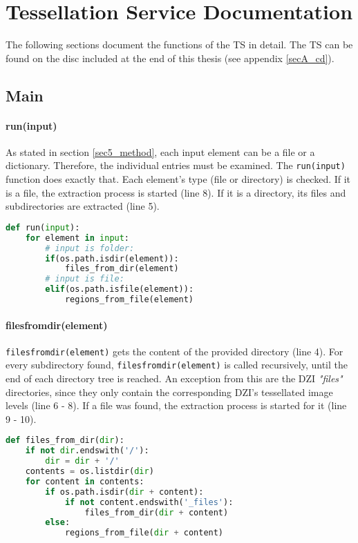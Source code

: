 \chapter{Tessellation Service Documentation}
\label{secC}
The following sections document the functions of the TS in detail. The TS can be found on the disc included at the end of this thesis (see appendix \ref{secA_cd}).

\section{Main}

\subsubsection{run(input)}
As stated in section \ref{sec5_method}, each input element can be a file or a dictionary. Therefore, the individual entries must be examined. The \texttt{run(input)} function does exactly that. Each element's type (file or directory) is checked. If it is a file, the extraction process is started (line 8). If it is a directory, its files and subdirectories are extracted (line 5).

\begin{lstlisting}[frame=single,language=python]
def run(input):
	for element in input:
		# input is folder:
		if(os.path.isdir(element)):
			files_from_dir(element)
		# input is file:
		elif(os.path.isfile(element)):
			regions_from_file(element)
\end{lstlisting}
\clearpage


\subsubsection{files{\textunderscore}from{\textunderscore}dir(element)}
\texttt{files{\textunderscore}from{\textunderscore}dir(element)} gets the content of the provided directory (line 4). For every subdirectory found, \texttt{files{\textunderscore}from{\textunderscore}dir(element)} is called recursively, until the end of each directory tree is reached. An exception from this are the DZI \emph{"{\textunderscore}files"} directories, since they only contain the corresponding DZI's tessellated image levels (line 6 - 8). If a file was found, the extraction process is started for it (line 9 - 10).

\begin{lstlisting}[frame=single,language=python]
def files_from_dir(dir):
	if not dir.endswith('/'):
		dir = dir + '/'
	contents = os.listdir(dir)
	for content in contents:
		if os.path.isdir(dir + content):
			if not content.endswith('_files'):
				files_from_dir(dir + content)
		else:
			regions_from_file(dir + content)
\end{lstlisting}


